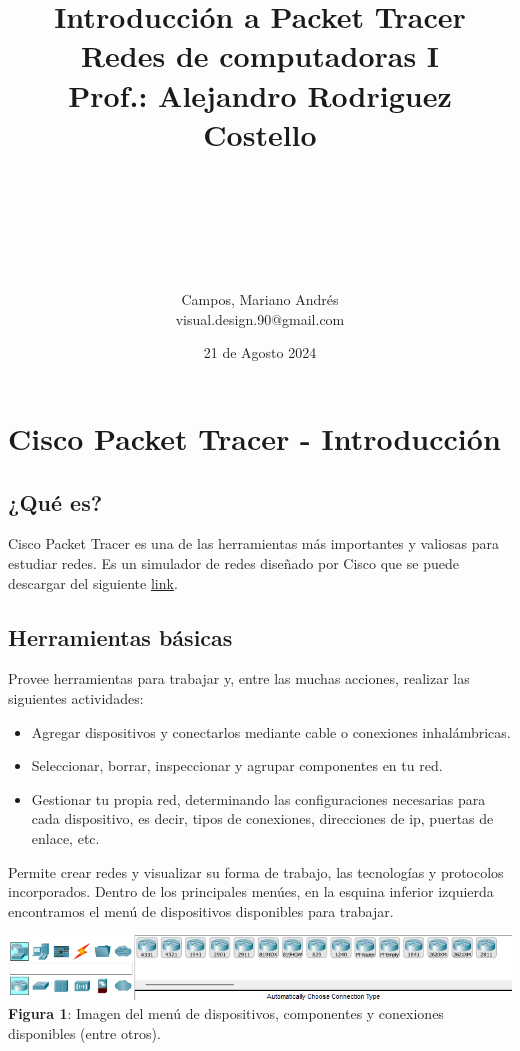 \documentclass{article}
\title{\bfseries \huge Introducción a Packet Tracer \normalsize{\linebreak\\Redes de computadoras I \\Prof.: Alejandro Rodriguez Costello}}
\author{\\\\\\\\\\\\Campos, Mariano Andrés \\ {\small visual.design.90@gmail.com}}
\date{\small 21 de Agosto 2024}
\begin{document}
    \maketitle
    \newpage

    \section{Cisco Packet Tracer - Introducción}
        \subsection{¿Qué es?}
        Cisco Packet Tracer es una de las herramientas más importantes y valiosas para estudiar redes. Es un simulador de redes diseñado por Cisco que se puede descargar del siguiente \href{https://skillsforall.com/resources/lab-downloads?courseLang=en-US}{link}.

        \subsection{Herramientas básicas}
        Provee herramientas para trabajar y, entre las muchas acciones, realizar las siguientes actividades:
        \begin{itemize}
            \item Agregar dispositivos y conectarlos mediante cable o conexiones inhalámbricas.
            \item Seleccionar, borrar, inspeccionar y agrupar componentes en tu red.
            \item Gestionar tu propia red, determinando las configuraciones necesarias para cada dispositivo, es decir, tipos de conexiones, direcciones de ip, puertas de enlace, etc.
        \end{itemize}
        Permite crear redes y visualizar su forma de trabajo, las tecnologías y protocolos incorporados. Dentro de los principales menúes, en la esquina inferior izquierda encontramos el menú de dispositivos disponibles para trabajar.\linebreak

        \begin{center}
            \includegraphics[width=0.65\linewidth]{img_1} 
            \linebreak
            \small {\bfseries Figura 1}: Imagen del menú de dispositivos, componentes y conexiones disponibles (entre otros).
        \end{center}
\end{document}
